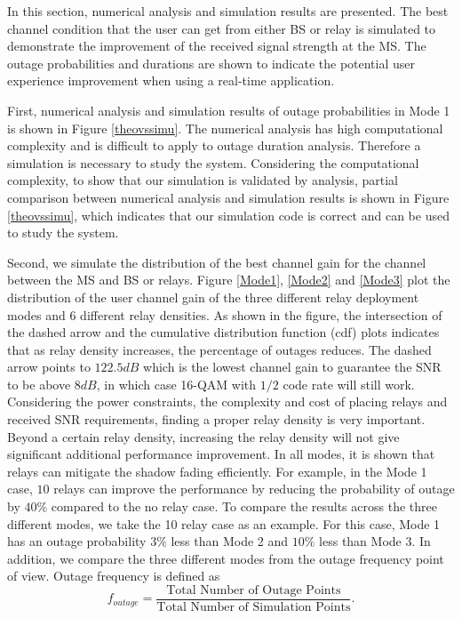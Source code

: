 \par In this section, numerical analysis and simulation results are presented. The best channel condition that the user can get from either BS or relay is simulated to demonstrate the improvement of the received signal strength at the MS. The outage probabilities and durations are shown to indicate the potential user experience improvement when using a real-time application.
\par First, numerical analysis and simulation results of outage probabilities in Mode 1 is shown in Figure \ref{theovssimu}. The numerical analysis has high computational complexity and is difficult to apply to outage duration analysis. Therefore a simulation is necessary to study the system. Considering the computational complexity, to show that our simulation is validated by analysis, partial comparison between numerical analysis and simulation results is shown in Figure \ref{theovssimu}, which indicates that our simulation code is correct and can be used to study the system.
\par Second, we simulate the distribution of the best channel gain for the channel between the MS and BS or relays. Figure \ref{Mode1}, \ref{Mode2}  and \ref{Mode3} plot the distribution of the user channel gain of the three different relay deployment modes and 6 different relay densities. As shown in the figure, the intersection of the dashed arrow and the cumulative distribution function (cdf) plots indicates that as relay density increases, the percentage of outages reduces. The dashed arrow points to $122.5dB$ which is the lowest channel gain to guarantee the SNR to be above $8dB$, in which case 16-QAM with $1/2$ code rate will still work. Considering the power constraints, the complexity and cost of placing relays and received SNR requirements, finding a proper relay density is very important. Beyond a certain relay density, increasing the relay density will not give significant additional performance improvement. In all modes, it is shown that relays can mitigate the shadow fading efficiently. For example, in the Mode 1 case, $10$ relays can improve the performance by reducing the probability of outage by $40\%$ compared to the no relay case. To compare the results across the three different modes, we take the 10 relay case as an example. For this case, Mode 1 has an outage probability $3\%$ less than Mode 2 and $10\%$ less than Mode 3. In addition, we compare the three different modes from the outage frequency point of view. Outage frequency is defined as
\begin{equation}
f_{outage}=\frac{\text{Total Number of Outage Points}}{\text{Total Number of Simulation Points}}.
\end{equation}
